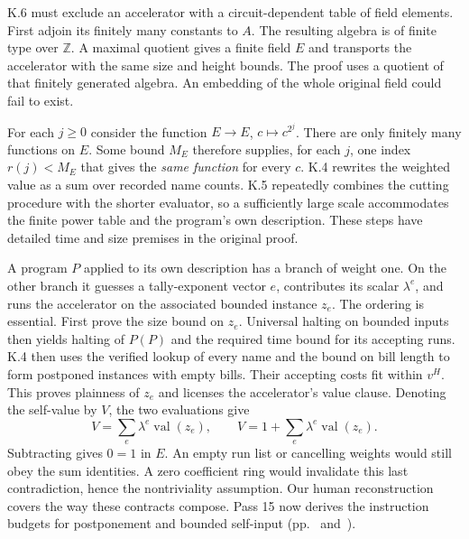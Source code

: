 
\clearpage
{}
K.6 must exclude an accelerator with a circuit-dependent table of field elements. First adjoin its finitely many constants to $A$. The resulting algebra is of finite type over $\mathbb Z$. A maximal quotient gives a finite field $E$ and transports the accelerator with the same size and height bounds. The proof uses a quotient of that finitely generated algebra. An embedding of the whole original field could fail to exist.

For each $j\ge0$ consider the function $E\to E$, $c\mapsto c^{2^j}$. There are only finitely many functions on $E$. Some bound $M_E$ therefore supplies, for each $j$, one index $r(j)<M_E$ that gives the \emph{same function} for every $c$. K.4 rewrites the weighted value as a sum over recorded name counts. K.5 repeatedly combines the cutting procedure with the shorter evaluator, so a sufficiently large scale accommodates the finite power table and the program's own description. These steps have detailed time and size premises in the original proof.

A program $P$ applied to its own description has a branch of weight one. On the other branch it guesses a tally-exponent vector $e$, contributes its scalar $\lambda^e$, and runs the accelerator on the associated bounded instance $z_e$. The ordering is essential. First prove the size bound on $z_e$. Universal halting on bounded inputs then yields halting of $P(P)$ and the required time bound for its accepting runs. K.4 then uses the verified lookup of every name and the bound on bill length to form postponed instances with empty bills. Their accepting costs fit within $v^H$. This proves plainness of $z_e$ and licenses the accelerator's value clause. Denoting the self-value by $V$, the two evaluations give
\[
 V=\sum_e\lambda^e\operatorname{val}(z_e),
 \qquad V=1+\sum_e\lambda^e\operatorname{val}(z_e).
\]
Subtracting gives $0=1$ in $E$. An empty run list or cancelling weights would still obey the sum identities. A zero coefficient ring would invalidate this last contradiction, hence the nontriviality assumption. Our human reconstruction covers the way these contracts compose. Pass 15 now derives the instruction budgets for postponement and bounded self-input (pp.~\pageref{sec:15k4} and~\pageref{sec:15k6}).

